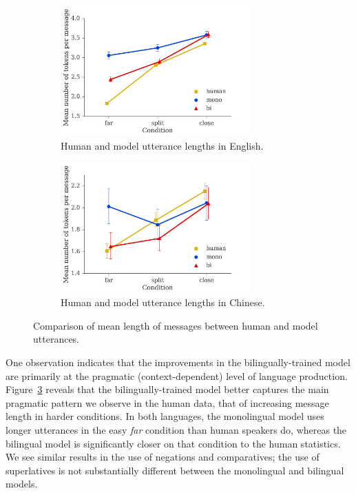 \documentclass[11pt,a4paper]{article}
\renewcommand{\|}{\mid}
\newcommand{\figref}[1]{Figure~\ref{#1}}
\begin{document}
\begin{figure}[!t]
    \begin{subfigure}[b]{\columnwidth}
    \centering
    \includegraphics[width=0.8\textwidth]{models_en_tokens.png}
    \caption{Human and model utterance lengths in English.}
    \label{fig:models_length:en}
    \end{subfigure}

    \begin{subfigure}[b]{\columnwidth}
    \centering
    \includegraphics[width=0.8\textwidth]{models_zh_tokens.png}
    \caption{Human and model utterance lengths in Chinese.}
    \label{fig:models_length:zh}
    \end{subfigure}
\caption{Comparison of mean length of messages between human and model utterances.}
\label{fig:models_length}
\end{figure}

One observation indicates that the improvements in the bilingually-trained model are primarily at the pragmatic (context-dependent) level of language production. \figref{fig:models_length} reveals that the bilingually-trained model better
captures the main pragmatic pattern we observe in the human data, that of increasing message length in harder conditions. In both languages, the monolingual model
uses longer utterances in the easy \emph{far} condition than human speakers do, whereas the bilingual model is
significantly closer on that condition to the human statistics. We see similar results in the use of negations
and comparatives; the use of superlatives is not substantially different between the monolingual and bilingual
models.
\end{document}
